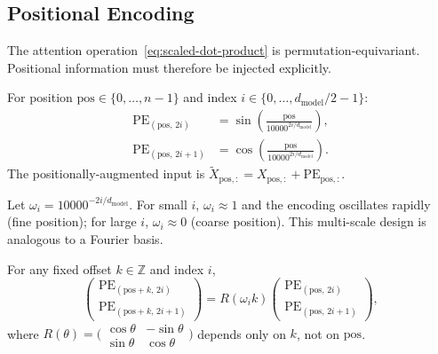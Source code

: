 \begin{deepdive}
\subsection{Positional Encoding}
\label{sec:transformer-pos}

The attention operation~\eqref{eq:scaled-dot-product} is permutation-equivariant.
Positional information must therefore be injected explicitly.

\begin{definition}
\label{def:positional-encoding}
For position $\mathrm{pos} \in \{0,\ldots,n-1\}$ and index
$i \in \{0,\ldots,d_{\mathrm{model}}/2 - 1\}$:
\begin{align}
  \mathrm{PE}_{(\mathrm{pos},\,2i)}
    &= \sin\!\left(\tfrac{\mathrm{pos}}{10000^{2i/d_{\mathrm{model}}}}\right),
  \label{eq:pe-sin}\\
  \mathrm{PE}_{(\mathrm{pos},\,2i+1)}
    &= \cos\!\left(\tfrac{\mathrm{pos}}{10000^{2i/d_{\mathrm{model}}}}\right).
  \label{eq:pe-cos}
\end{align}
The positionally-augmented input is
$\tilde{X}_{\mathrm{pos},:} = X_{\mathrm{pos},:} + \mathrm{PE}_{\mathrm{pos},:}$.
\end{definition}

Let $\omega_i = 10000^{-2i/d_{\mathrm{model}}}$.
For small $i$, $\omega_i \approx 1$ and the encoding oscillates rapidly (fine
position); for large $i$, $\omega_i \approx 0$ (coarse position).
This multi-scale design is analogous to a Fourier basis.

\begin{proposition}
\label{thm:pe-relative}
For any fixed offset $k \in \mathbb{Z}$ and index $i$,
\begin{equation}
  \begin{pmatrix}
    \mathrm{PE}_{(\mathrm{pos}+k,\,2i)} \\
    \mathrm{PE}_{(\mathrm{pos}+k,\,2i+1)}
  \end{pmatrix}
  = R(\omega_i k)
  \begin{pmatrix}
    \mathrm{PE}_{(\mathrm{pos},\,2i)} \\
    \mathrm{PE}_{(\mathrm{pos},\,2i+1)}
  \end{pmatrix},
  \label{eq:pe-rotation}
\end{equation}
where $R(\theta) = \bigl(\begin{smallmatrix} \cos\theta & -\sin\theta \\ \sin\theta
& \cos\theta \end{smallmatrix}\bigr)$ depends only on $k$, not on $\mathrm{pos}$.
\end{proposition}


\end{deepdive}
